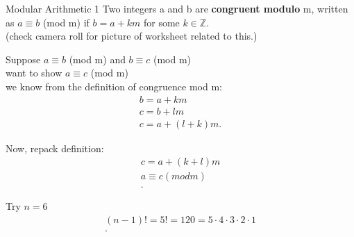 \documentclass{report}
\begin{document}
  
\begin{definition} {Modular Arithmetic} { 1 }
  Two integers a and b are \textbf{congruent modulo} m, written as $a \equiv b $ (mod m) if $b=a + km$ for some  $k \in \mathbb{Z}$. \\
(check camera roll for picture of worksheet related to this.) \\
\end{definition}


 {
  Suppose $a \equiv b$ (mod m) and  $b \equiv c$ (mod m) \\
  want to show  $a \equiv c$ (mod m) \\
  we know from the definition of congruence mod m:
   \begin{align*}
    b = a + km \\
    c = b + lm \\
    c = a + (l + k)m
  .\end{align*}
  
  Now, repack definition:
  \begin{align*}
    c = a + (k + l)m \\
    a \equiv c (mod m) \\
  .\end{align*}
}

 {
  Try $n = 6$ \\
  \begin{align*}
    (n-1)! = 5! = 120 = 5 \cdot 4 \cdot 3 \cdot 2 \cdot 1\\
  .\end{align*}
}
\end{document}

